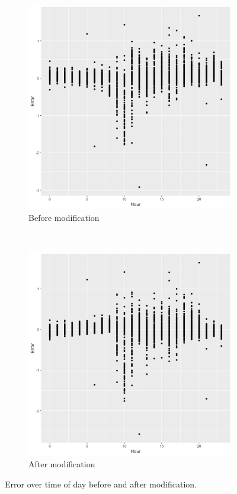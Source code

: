 \documentclass[a4paper]{article}
\begin{document}
\begin{figure}[ht!]
    \centering
    \begin{subfigure}[b]{0.45\textwidth}
        \includegraphics[width=\textwidth]{part2a-fit1-hour.png}
        \caption{Before modification}
    \end{subfigure}
    ~
    \begin{subfigure}[b]{0.45\textwidth}
        \includegraphics[width=\textwidth]{part2a-fit2-hour.png}
        \caption{After modification}
    \end{subfigure}
    \caption{Error over time of day before and after modification.}
    \label{fig:part2a-fit-hour}
\end{figure}
\end{document}
